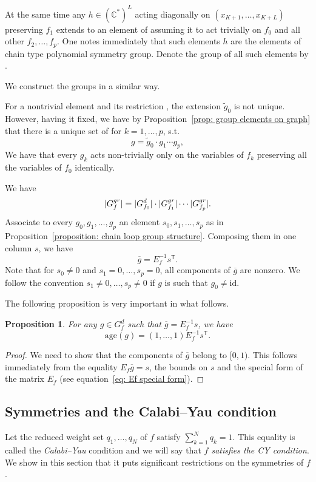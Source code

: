 \documentclass[10pt,a4paper]{article}
\numberwithin{equation}{section}
\newtheorem{Proposition}[Theorem]{Proposition}
 { \theoremstyle{definition}
\newtheorem{Definition}[Theorem]{Definition}
\newtheorem{Note}[Theorem]{Note}
\newtheorem{Example}[Theorem]{Example}
\newtheorem{Remark}[Theorem]{Remark} }
\newcommand{\CC}{{\mathbb{C}}}
\newcommand{\id}{\mathrm{id}}
\newcommand{\age}{\mathrm{age}}
\begin{document}
At the same time any $h \in (\CC^\ast)^{L}$ acting diagonally on $(x_{K+1},\dots,x_{K+L})$ preserving $f_1$ extends to an element of  assuming it to act trivially on $f_0$ and all other $f_2,\dots,f_p$. One notes immediately that such elements $h$ are the elements of chain type polynomial symmetry group. Denote the group of all such elements by .

We construct the groups  in a similar way.

For a nontrivial element  and its restriction , the extension $\widetilde g_0$ is not unique. However, having it fixed, we have by Proposition~\ref{prop: group elements on graph} that there is a unique set of  for $k=1,\dots,p$, s.t.
\[
	g = \widetilde g_0\cdot g_1 \cdots g_p,
\]
We have that every $g_k$ acts non-trivially only on the variables of $f_k$ preserving all the variables of $f_0$ identically.

We have
\[
	|G_f^{\rm gr}| = |G_{f_0}^d|\cdot |G_{f_1}^{\rm gr}| \cdots |G_{f_p}^{\rm gr}|.
\]
Associate to every $g_0,g_1,\dots,g_p$ an element $s_0,s_1,\dots,s_p$ as in Proposition~\ref{proposition: chain loop group structure}. Composing them in one column $s$, we have
\[
	\overline g = E_f^{-1} s^{\mathsf{T}}.
\]
Note that for $s_0 \neq 0$ and $s_1=0, \dots, s_p =0$, all components of $\overline g$ are nonzero. We follow the convention $s_1 \neq 0, \dots, s_p \neq 0$ if $g$ is such that $g_0 \neq \id$.

The following proposition is very important in what follows.

\begin{Proposition}\label{prop: age by matrix}
	For any $g \in G_f^d$ such that $\overline g = E_f^{-1} s$, we have
	\[
	\age(g) = (1,\dots,1) E_f^{-1} s^{\mathsf{T}}.
	\]
\end{Proposition}
\begin{proof}
	We need to show that the components of $\overline g$ belong to $[0,1)$. This follows immediately from the equality $E_f \overline g = s$, the bounds on $s$ and the special form of the matrix $E_f$ (see equation~\eqref{eq: Ef special form}).
\end{proof}

\subsection{Symmetries and the Calabi--Yau condition}\label{section: symmetries under CY}
Let the reduced weight set $q_1,\dots,q_N$ of $f$ satisfy $\sum_{k=1}^N q_k = 1$. This equality is called the \textit{Calabi--Yau} condition and we will say that \textit{$f$ satisfies the CY condition}. We show in this section that it puts significant restrictions on the symmetries of $f$.
\end{document}
